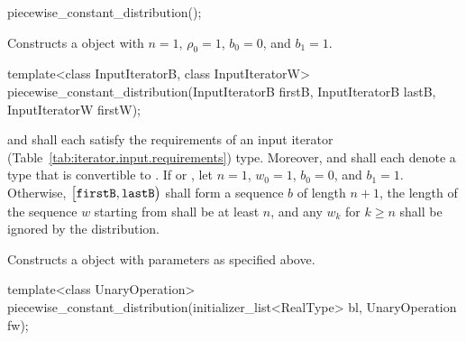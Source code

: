 %
\begin{itemdecl}
piecewise_constant_distribution();
\end{itemdecl}

\begin{itemdescr}
\pnum\effects Constructs a  object
 with $ n = 1 $,
 $\rho_0 = 1 $,
 $ b_0 = 0 $,
 and $ b_1 = 1 $.
\end{itemdescr}


%
\begin{itemdecl}
template<class InputIteratorB, class InputIteratorW>
 piecewise_constant_distribution(InputIteratorB firstB, InputIteratorB lastB,
                                 InputIteratorW firstW);
\end{itemdecl}

\begin{itemdescr}
\pnum\requires
   and 
  shall each satisfy the requirements
  of an input iterator (Table~\ref{tab:iterator.input.requirements}) type.
  Moreover,
   and
  shall each denote a type that is convertible to .
 If 
 or ,
 let $ n = 1 $,
     $ w_0 = 1 $,
     $ b_0 = 0 $,
 and $ b_1 = 1 $.
 Otherwise,
 $\bigl[\texttt{firstB}, \texttt{lastB}\bigr)$
 shall form a sequence $b$ of length $n+1$,
 the length of the sequence $w$ starting from 
 shall be at least $n$,
 and any $w_k$ for  $k \geq n$ shall be ignored by the distribution.

\pnum\effects Constructs a  object
 with parameters as specified above.
\end{itemdescr}


%
\begin{itemdecl}
template<class UnaryOperation>
 piecewise_constant_distribution(initializer_list<RealType> bl, UnaryOperation fw);
\end{itemdecl}

